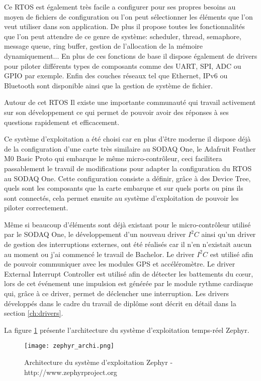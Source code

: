 Ce RTOS est également très facile a configurer pour ses propres besoins au moyen de fichiers de configuration ou l'on peut sélectionner les éléments que l'on veut utiliser dans son application. De plus il propose toutes les fonctionnalités que l'on peut attendre de ce genre de système: scheduler, thread, semaphore, message queue, ring buffer, gestion de l'allocation de la mémoire dynamiquement...
En plus de ces fonctions de base il dispose également de drivers pour piloter différents types de composants comme des UART, SPI, ADC ou GPIO par exemple. Enfin des couches réseaux tel que Ethernet, IPv6 ou Bluetooth sont disponible ainsi que la gestion de système de fichier. \cite{zephyr_web}

Autour de cet RTOS Il existe une importante communauté qui travail activement sur son développement ce qui permet de pouvoir avoir des réponses à ses questions rapidement et efficacement.

Ce système d'exploitation a été choisi car en plus d'être moderne il dispose déjà de la configuration d'une carte très similaire au SODAQ One, le Adafruit Feather M0 Basic Proto qui embarque le même micro-contrôleur, ceci facilitera passablement le travail de modifications pour adapter la configuration du RTOS au SODAQ One. Cette configuration consiste a définir, grâce à des Device Tree, quels sont les composants que la carte embarque et sur quels ports ou pins ils sont connectés, cela permet ensuite au système d'exploitation de pouvoir les piloter correctement.

Même si beaucoup d'éléments sont déjà existant pour le micro-contrôleur utilisé par le SODAQ One, le développement d'un nouveau driver $I^{2}C$ ainsi qu'un driver de gestion des interruptions externes, ont été réalisés car il n'en n'existait aucun au moment ou j'ai commencé le travail de Bachelor. Le driver $I^{2}C$ est utilisé afin de pouvoir communiquer avec les modules GPS et accéléromètre. Le driver External Interrupt Controller est utilisé afin de détecter les battements du cœur, lors de cet événement une impulsion est générée par le module rythme cardiaque qui, grâce à ce driver, permet de déclencher une interruption. Les drivers développés dans le cadre du travail de diplôme sont décrit en détail dans la section \ref{ch:drivers}.

La figure \ref{fig:zephyr_archi} présente l'architecture du système d'exploitation temps-réel Zephyr.

\begin{figure}[htb]
\centering 
\texttt{[image: zephyr\_archi.png]} 
\caption{Architecture du système d'exploitation Zephyr - http://www.zephyrproject.org}
\label{fig:zephyr_archi}
\end{figure}

